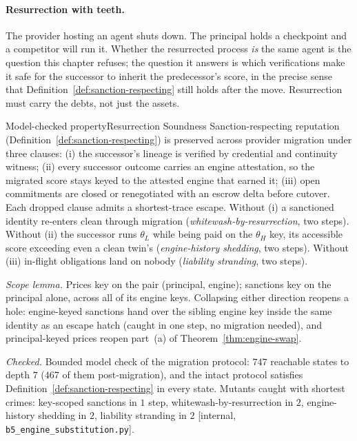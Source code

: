 \documentclass[11pt,a4paper]{article}
\theoremstyle{definition}
\newcounter{protocol}[section]
\begin{document}
\paragraph{Resurrection with teeth.} The provider hosting an agent shuts down.
The principal holds a checkpoint and a competitor will run it. Whether the
resurrected process \emph{is} the same agent is the question this chapter
refuses; the question it answers is which verifications make it safe for the
successor to inherit the predecessor's score, in the precise sense that
Definition~\ref{def:sanction-respecting} still holds after the move.
Resurrection must carry the debts, not just the assets.

\begin{pdclaim}{Model-checked property}{Resurrection Soundness}
\setlength{\parskip}{4pt plus 1pt}
\label{thm:resurrection-soundness}
Sanction-respecting reputation (Definition~\ref{def:sanction-respecting}) is
preserved across provider migration under three clauses: (i) the successor's
lineage is verified by credential and continuity witness; (ii) every
successor outcome carries an engine attestation, so the migrated score stays
keyed to the attested engine that earned it; (iii) open commitments are
closed or renegotiated with an escrow delta before cutover. Each dropped
clause admits a shortest-trace escape. Without (i) a sanctioned identity
re-enters clean through migration (\emph{whitewash-by-resurrection}, two
steps). Without (ii) the successor runs $\theta_L$ while being paid on the
$\theta_H$ key, its accessible score exceeding even a clean twin's
(\emph{engine-history shedding}, two steps). Without (iii) in-flight
obligations land on nobody (\emph{liability stranding}, two steps).

\smallskip\noindent\emph{Scope lemma.} Prices key on the pair (principal,
engine); sanctions key on the principal alone, across all of its engine keys.
Collapsing either direction reopens a hole: engine-keyed sanctions hand over
the sibling engine key inside the same identity as an escape hatch (caught in
one step, no migration needed), and principal-keyed prices reopen part~(a) of
Theorem~\ref{thm:engine-swap}.

\smallskip\noindent\emph{Checked.} Bounded model check of the migration
protocol: $747$ reachable states to depth $7$ ($467$ of them
post-migration), and the intact protocol satisfies
Definition~\ref{def:sanction-respecting} in every state. Mutants caught with
shortest crimes: key-scoped sanctions in $1$ step, whitewash-by-resurrection
in $2$, engine-history shedding in $2$, liability stranding in $2$ [internal,
\texttt{b5\_engine\_substitution.py}].
\end{pdclaim}
\end{document}
